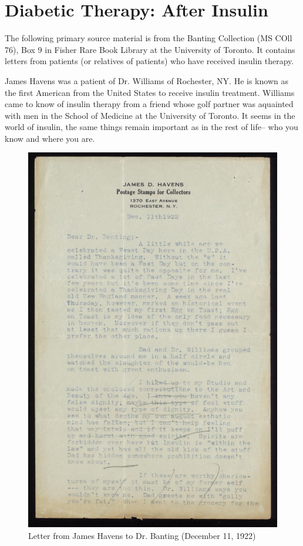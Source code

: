 \documentclass[12pt]{article}
\begin{document}
\section{Diabetic Therapy: After Insulin}
The following primary source material is from the Banting Collection (MS COll 76), Box 9 in Fisher Rare Book Library at the University of Toronto. It contains letters from patients (or relatives of patients) who have received insulin therapy. 

James Havens was a patient of Dr. Williams of Rochester, NY. He is known as the first American from the United States to receive insulin treatment. Williams came to know of insulin therapy from a friend whose golf partner was aquainted with men in the School of Medicine at the University of Toronto. It seems in the world of insulin, the same things remain important as in the rest of life-- who you know and where you are. 
\begin{figure}[H]
\centering
  \includegraphics [width=5in]{thanksgivinghavens}
  \caption{Letter from James Havens to Dr. Banting (December 11, 1922)}
  \label{fig: Thanksgiving Letter}
\end{figure}
\end{document}
